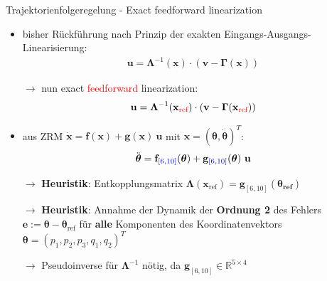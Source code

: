 \documentclass[
	ngerman,
	10pt,				%
	aspectratio=169 	%
]{beamer}
\begin{document}
\begin{frame}[t,fragile,label=trajektorienregelung_9]{\large Trajektorienfolgeregelung - Exact feedforward linearization}
	
	\begin{itemize}
		\item bisher Rückführung nach Prinzip der exakten Eingangs-Ausgangs-Linearisierung:
		\begin{align*}
			\mathbf{u} = \boldsymbol{\Lambda }^{-1}(\mathbf{x}) \cdot (\mathbf{v} - \boldsymbol{\Gamma}(\mathbf{x}))
		\end{align*}
		\item[$\rightarrow$] nun exact \textcolor{red}{feedforward} linearization:
		\begin{align*}
			\mathbf{u} = \boldsymbol{\Lambda}^{-1}(\mathbf{x}_{\textcolor{red}{\text{ref}}}) \cdot (\mathbf{v} - \boldsymbol{\Gamma}(\mathbf{x}_{\textcolor{red}{\text{ref}}}))
		\end{align*}
		\pause
		\item aus ZRM $\dot{\mathbf{x}} = \mathbf{f}(\mathbf{x}) + \mathbf{g}(\mathbf{x}) \ \mathbf{u}$ mit $\mathbf{x} = (\boldsymbol{\theta}, \dot{\boldsymbol{\theta}})^T$:
		\begin{align*}
			\ddot{\boldsymbol{\theta}} = \mathbf{f}_{\textcolor{blue}{[6, 10]}}(\boldsymbol{\theta}) + \mathbf{g}_{\textcolor{blue}{[6, 10]}}(\boldsymbol{\theta}) \ \mathbf{u}
		\end{align*}
		\pause
		\item[$\rightarrow$] \textbf{Heuristik}: Entkopplungsmatrix $\boldsymbol{\Lambda}(\mathbf{x}_{\text{ref}}) = \mathbf{g}_{[6, 10]}(\boldsymbol{\theta_{\text{ref}}})$
		\pause
		\item[$\rightarrow$] \textbf{Heuristik}: Annahme der Dynamik der \textbf{Ordnung 2} des Fehlers $\mathbf{e} := \boldsymbol{\theta} - \boldsymbol{\theta}_{\text{ref}}$ für \textbf{alle} Komponenten des Koordinatenvektors $\boldsymbol{\theta} = (p_1, p_2, p_3, q_1, q_2)^T$
		\pause
		\item[$\rightarrow$] Pseudoinverse für $\boldsymbol{\Lambda}^{-1}$ nötig, da $\mathbf{g}_{[6, 10]} \in \mathbb{R}^{5 \times 4}$
		
	\end{itemize}
	

\end{frame}
\end{document}

